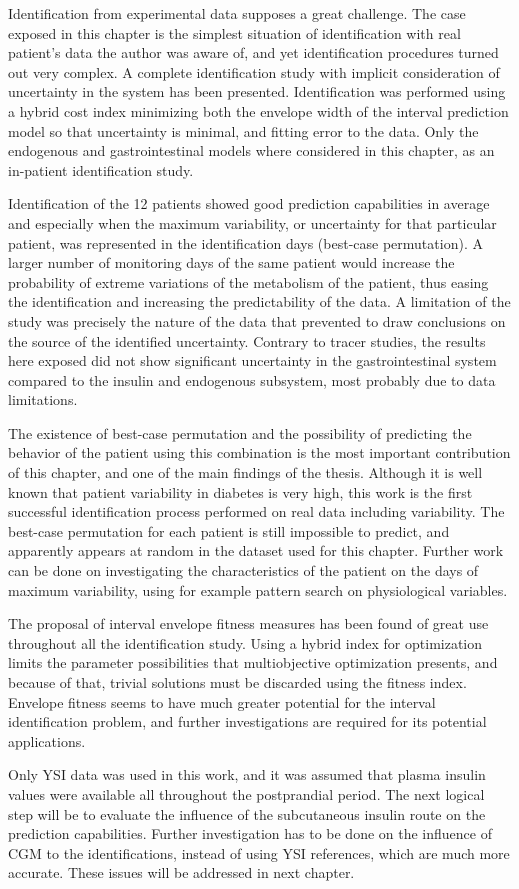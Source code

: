 Identification from experimental data supposes a great challenge. The case exposed in this chapter is the simplest situation of identification with real patient's data the author was aware of, and yet identification procedures turned out very complex. A complete identification study with implicit consideration of uncertainty in the system has been presented. Identification was performed using a hybrid cost index minimizing both the envelope width of the interval prediction model so that uncertainty is minimal, and fitting error to the data. Only the endogenous and gastrointestinal models where considered in this chapter, as an in-patient identification study.

Identification of the 12 patients showed good prediction capabilities in average and especially when the maximum variability, or uncertainty for that particular patient, was represented in the identification days (best-case permutation). A larger number of monitoring days of the same patient would increase the probability of extreme variations of the metabolism of the patient, thus easing the identification and increasing the predictability of the data. A limitation of the study was precisely the nature of the data that prevented to draw conclusions on the source of the identified uncertainty. Contrary to tracer studies, the results here exposed did not show significant uncertainty in the gastrointestinal system compared to the insulin and endogenous subsystem, most probably due to data limitations. 

The existence of best-case permutation and the possibility of predicting the behavior of the patient using this combination is the most important contribution of this chapter, and one of the main findings of the thesis. Although it is well known that patient variability in diabetes is very high, this work is the first successful identification process performed on real data including variability. The best-case permutation for each patient is still impossible to predict, and apparently appears at random in the dataset used for this chapter. Further work can be done on investigating the characteristics of the patient on the days of maximum variability, using for example pattern search on physiological variables.

The proposal of interval envelope fitness measures has been found of great use throughout all the identification study. Using a hybrid index for optimization limits the parameter possibilities that multiobjective optimization presents, and because of that, trivial solutions must be discarded using the fitness index. Envelope fitness seems to have much greater potential for the interval identification problem, and further investigations are required for its potential applications.

Only YSI data was used in this work, and it was assumed that plasma insulin values were available all throughout the postprandial period. The next logical step will be to evaluate the influence of the subcutaneous insulin route on the prediction capabilities. Further investigation has to be done on the influence of CGM to the identifications, instead of using YSI references, which are much more accurate. These issues will be addressed in next chapter.

